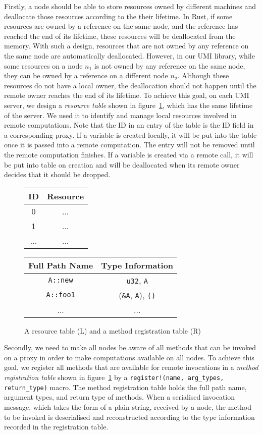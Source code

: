 Firstly, a node should be able to store resources owned by different machines and deallocate those resources according to the their lifetime.
In Rust, if some resources are owned by a reference on the same node, and the reference has reached the end of its lifetime, these resources will be deallocated from the memory. With such a design, resources that are not owned by any reference on the same node are automatically deallocated. However, in our UMI library, while some resources on a node $n_1$ is not owned by any reference on the same node, they can be owned by a reference on a different node $n_2$. Although these resources do not have a local owner, the deallocation should not happen until the remote owner reaches the end of its lifetime. 
To achieve this goal, on each UMI server, we design a \emph{resource table} shown in figure~\ref{chap3:impl:tables}, which has the same lifetime of the server. We used it to identify and manage local resources involved in remote computations. Note that the ID in an entry of the table is the ID field in a corresponding proxy.
If a variable is created locally, it will be put into the table once it is passed into a remote computation. The entry will not be removed until the remote computation finishes. If a variable is created via a remote call, it will be put into table on creation and will be deallocated when its remote owner decides that it should be dropped.
\begin{figure}
\centering
\begin{tabular}{ |c|c| } 
\hline
\textbf{ID} & \textbf{Resource} \\\hline
0 & ... \\\hline
1 & ... \\\hline
... & ... \\
\hline
\end{tabular}
\quad
\begin{tabular}{ |c|c| } 
\hline
\textbf{Full Path Name} & \textbf{Type Information} \\\hline
\texttt{A::new} & \texttt{u32}, \texttt{A} \\\hline
\texttt{A::foo1} &  (\texttt{\&A}, \texttt{A}), \texttt{()} \\\hline
... & ... \\
\hline
\end{tabular}
\caption{A resource table (L) and a method registration table (R)}
\label{chap3:impl:tables}
\end{figure}

Secondly, we need to make all nodes be aware of all methods that can be invoked on a proxy in order to make computations available on all nodes. To achieve this goal, we register all methods that are available for remote invocations in a \emph{method registration table} shown in figure~\ref{chap3:impl:tables} by a \texttt{register!(name, arg\_types, return\_type)} macro. The method registration table holds the full path name, argument types, and return type of methods. When a serialised invocation message, which takes the form of a plain string, received by a node, the method to be invoked is deserialised and reconstructed according to the type information recorded in the registration table.

